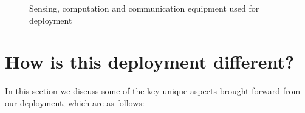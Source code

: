 \documentclass[10pt]{sensys-proc}
\begin{document}
\begin{figure}
            \hspace{1mm}
                  \hspace{1mm}

    \caption{Sensing, computation and communication equipment used for deployment}

    \label{fig:deployment}

\end{figure}

\section{How is this deployment different?}
\label{sec:learning}
In this section we discuss some of the key unique aspects brought forward from our deployment, which are as follows:
\end{document}
